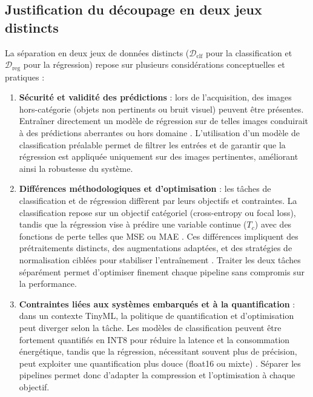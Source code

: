 
\subsection{Justification du découpage en deux jeux distincts}

La séparation en deux jeux de données distincts (\(\mathcal{D}_{\text{clf}}\) pour la classification et \(\mathcal{D}_{\text{reg}}\) pour la régression) repose sur plusieurs considérations conceptuelles et pratiques :
\begin{enumerate}
	\item \textbf{Sécurité et validité des prédictions} : lors de l'acquisition, des images hors-catégorie (objets non pertinents ou bruit visuel) peuvent être présentes. Entraîner directement un modèle de régression sur de telles images conduirait à des prédictions aberrantes ou hors domaine \cite{zhang2018generalized}. L'utilisation d'un modèle de classification préalable permet de filtrer les entrées et de garantir que la régression est appliquée uniquement sur des images pertinentes, améliorant ainsi la robustesse du système.

	\item \textbf{Différences méthodologiques et d'optimisation} : les tâches de classification et de régression diffèrent par leurs objectifs et contraintes. La classification repose sur un objectif catégoriel (cross-entropy ou focal loss), tandis que la régression vise à prédire une variable continue (\(T_c\)) avec des fonctions de perte telles que MSE ou MAE \cite{goodfellow2016deep}. Ces différences impliquent des prétraitements distincts, des augmentations adaptées, et des stratégies de normalisation ciblées pour stabiliser l’entraînement \cite{lecun2015deep}. Traiter les deux tâches séparément permet d’optimiser finement chaque pipeline sans compromis sur la performance.

	\item \textbf{Contraintes liées aux systèmes embarqués et à la quantification} : dans un contexte TinyML, la politique de quantification et d’optimisation peut diverger selon la tâche. Les modèles de classification peuvent être fortement quantifiés en INT8 pour réduire la latence et la consommation énergétique, tandis que la régression, nécessitant souvent plus de précision, peut exploiter une quantification plus douce (float16 ou mixte) \cite{han2020tinyml}. Séparer les pipelines permet donc d’adapter la compression et l’optimisation à chaque objectif.
\end{enumerate}

